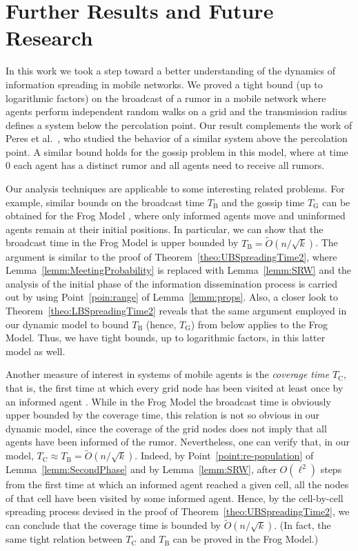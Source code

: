 \documentclass[11pt]{article}
\newcommand{\newterm}[1]{\emph{#1}}
\newcommand{\bigO}[1]{O\left(#1\right)}
\newcommand{\bigOt}[1]{\tilde{O}\left(#1\right)}
\newcommand{\bt}{T_{\mathrm{B}}}
\newcommand{\gt}{T_{\mathrm{G}}}
\newcommand{\ct}{T_{\mathrm{C}}}
\begin{document}
\section{Further Results and Future Research}
\label{sec:conclusions}

In this work we took a step toward a better understanding of the
dynamics of information spreading in mobile networks.  We proved a
tight bound (up to logarithmic factors) on the broadcast of a rumor in
a mobile network where agents perform independent random walks on a
grid and the transmission radius defines a system below the
percolation point.  Our result complements the work of Peres et
al.~\cite{PeresSSS11}, who studied the behavior of a similar system
above the percolation point.  A similar bound holds for the gossip
problem in this model, where at time $0$ each agent has a distinct
rumor and all agents need to receive all rumors.

Our analysis techniques are applicable to some interesting related
problems.  For example, similar bounds on the broadcast time $\bt$ and
the gossip time $\gt$ can be obtained for the Frog Model
\cite{AlvesMP02}, where only informed agents move and uninformed
agents remain at their initial positions.  In particular, we can show
that the broadcast time in the Frog Model is upper bounded by $\bt =
\bigOt{n/\sqrt{k}}$.  The argument is similar to the proof of
Theorem~\ref{theo:UBSpreadingTime2}, where
Lemma~\ref{lemm:MeetingProbability} is replaced with
Lemma~\ref{lemm:SRW} and the analysis of the initial phase of the
information dissemination process is carried out by using
Point~\ref{poin:range} of Lemma~\ref{lemm:props}. Also, a closer look to
Theorem~\ref{theo:LBSpreadingTime2} reveals that the same argument
employed in our dynamic model to bound $\bt$ (hence, $\gt$) from below 
applies to the Frog Model. Thus, we have tight bounds, up to
logarithmic factors, in this latter model as well.

Another measure of interest in systems of mobile agents is the
\newterm{coverage time} $\ct$, that is, the first time at which every
grid node has been visited at least once by an informed agent
\cite{PeresSSS11}. While in the Frog Model the broadcast time is
obviously upper bounded by the coverage time, this relation is not so
obvious in our dynamic model, since the coverage of the grid nodes
does not imply that all agents have been informed of the rumor.
Nevertheless, one can verify that, in our model, $\ct \approx \bt =
\bigOt{n/\sqrt{k}}$.  Indeed, by Point~\ref{point:re-population} of
Lemma~\ref{lemm:SecondPhase} and by Lemma~\ref{lemm:SRW}, after
$\bigO{\ell^2}$ steps from the first time at which an informed agent
reached a given cell, all the nodes of that cell have been visited by
some informed agent.  Hence, by the cell-by-cell spreading process
devised in the proof of Theorem~\ref{theo:UBSpreadingTime2}, we can
conclude that the coverage time is bounded by $\bigOt{n/\sqrt{k}}$.
(In fact, the same tight relation between $\ct$ and $\bt$ can be
proved in the Frog Model.)
\end{document}

